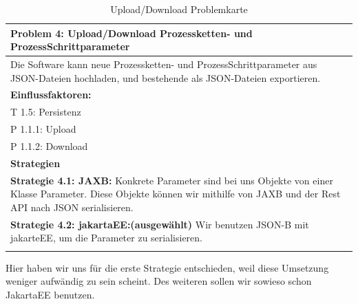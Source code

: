 \documentclass[enabledeprecatedfontcommands,fontsize=12pt,paper=a4,twoside]{scrartcl}
\begin{document}
\begin{table}[H]
    \centering
    \begin{tabular}{|p{15cm}|}
    \hline
          \textbf{Problem 4:} Upload/Download Prozessketten- und ProzessSchrittparameter \\ \hline
          Die Software kann neue Prozessketten- und ProzessSchrittparameter aus JSON-Dateien hochladen, und bestehende als JSON-Dateien exportieren.
          \\ \hline
          \textbf{Einflussfaktoren: } \\
          T 1.5: Persistenz \\
          P 1.1.1: Upload\\
          P 1.1.2: Download\\
          \hline
          \textbf{Strategien} \\ \hline
            {}          
           \label{strategie:4.1}     
          \textbf{Strategie 4.1: JAXB:}  Konkrete Parameter sind bei uns Objekte von einer Klasse Parameter. Diese Objekte können wir mithilfe von JAXB und der Rest API nach JSON serialisieren. \\ 
            {}          
           \label{strategie:4.2}     
          \textbf{Strategie 4.2: jakartaEE:(ausgewählt)} Wir benutzen JSON-B mit jakarteEE, um die Parameter zu serialisieren. \\
          \\ \hline
    \end{tabular}
    \caption{Upload/Download Problemkarte}
    \label{tab:ProblemKarte4}
\end{table}
Hier haben wir uns für die erste Strategie entschieden, weil diese Umsetzung weniger aufwändig zu sein scheint. Des weiteren sollen wir sowieso schon JakartaEE benutzen. \\
\end{document}

